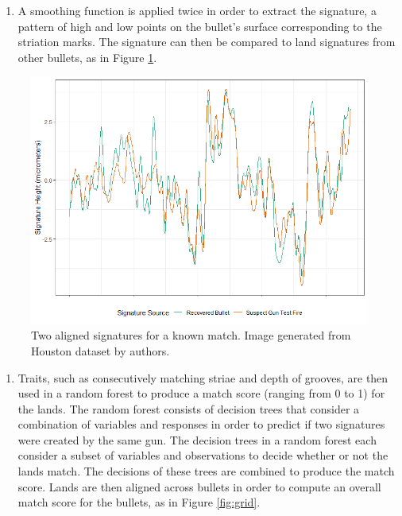 \documentclass[print]{nuthesis}
\providecommand{\tightlist}{%
  \setlength{\itemsep}{0pt}\setlength{\parskip}{0pt}}
\begin{document}
\begin{enumerate}
\def\labelenumi{\arabic{enumi}.}
\setcounter{enumi}{1}
\tightlist
\item
  A smoothing function is applied twice in order to extract the signature, a pattern of high and low points on the bullet's surface corresponding to the striation marks.
  The signature can then be compared to land signatures from other bullets, as in Figure \ref{fig:signature}.
\end{enumerate}

\begin{figure}
\includegraphics[width=\linewidth]{images/F526_Match_Signatures} \caption[Two aligned signatures for a known match]{Two aligned signatures for a known match. Image generated from Houston dataset by authors.}\label{fig:signature}
\end{figure}

\begin{enumerate}
\def\labelenumi{\arabic{enumi}.}
\setcounter{enumi}{2}
\tightlist
\item
  Traits, such as consecutively matching striae and depth of grooves, are then used in a random forest to produce a match score (ranging from 0 to 1) for the lands.
  The random forest consists of decision trees that consider a combination of variables and responses in order to predict if two signatures were created by the same gun.
  The decision trees in a random forest each consider a subset of variables and observations to decide whether or not the lands match.
  The decisions of these trees are combined to produce the match score.
  Lands are then aligned across bullets in order to compute an overall match score for the bullets, as in Figure \ref{fig:grid}.
\end{enumerate}
\end{document}
